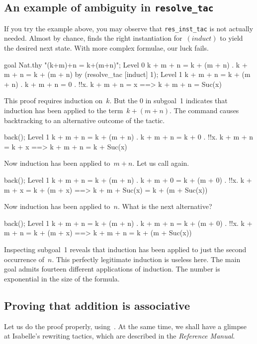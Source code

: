 \subsection{An example of ambiguity in {\tt resolve_tac}}
If you try the example above, you may observe that {\tt res_inst_tac} is
not actually needed.  Almost by chance,  finds the right
instantiation for~$(induct)$ to yield the desired next state.  With more
complex formulae, our luck fails.  
\begin{ttbox} 
goal Nat.thy "(k+m)+n = k+(m+n)";
{\out Level 0}
{\out k + m + n = k + (m + n)}
{. k + m + n = k + (m + n)}
\ttbreak
by (resolve_tac [induct] 1);
{\out Level 1}
{\out k + m + n = k + (m + n)}
{. k + m + n = 0}
{. !!x. k + m + n = x ==> k + m + n = Suc(x)}
\end{ttbox} 
This proof requires induction on~$k$.  But the 0 in subgoal~1 indicates
that induction has been applied to the term~$k+(m+n)$.  The
 command causes backtracking to an alternative
outcome of the tactic.  
\begin{ttbox} 
back();
{\out Level 1}
{\out k + m + n = k + (m + n)}
{. k + m + n = k + 0}
{. !!x. k + m + n = k + x ==> k + m + n = k + Suc(x)}
\end{ttbox} 
Now induction has been applied to~$m+n$.  Let us call 
again.
\begin{ttbox} 
back();
{\out Level 1}
{\out k + m + n = k + (m + n)}
{. k + m + 0 = k + (m + 0)}
{. !!x. k + m + x = k + (m + x) ==> k + m + Suc(x) = k + (m + Suc(x))}
\end{ttbox} 
Now induction has been applied to~$n$.  What is the next alternative?
\begin{ttbox} 
back();
{\out Level 1}
{\out k + m + n = k + (m + n)}
{. k + m + n = k + (m + 0)}
{. !!x. k + m + n = k + (m + x) ==> k + m + n = k + (m + Suc(x))}
\end{ttbox} 
Inspecting subgoal~1 reveals that induction has been applied to just the
second occurrence of~$n$.  This perfectly legitimate induction is useless
here.  The main goal admits fourteen different applications of induction.
The number is exponential in the size of the formula.

\subsection{Proving that addition is associative}
Let us do the proof properly, using~.  At the same
time, we shall have a glimpse at Isabelle's rewriting tactics, which are
described in the {\em Reference Manual}.

